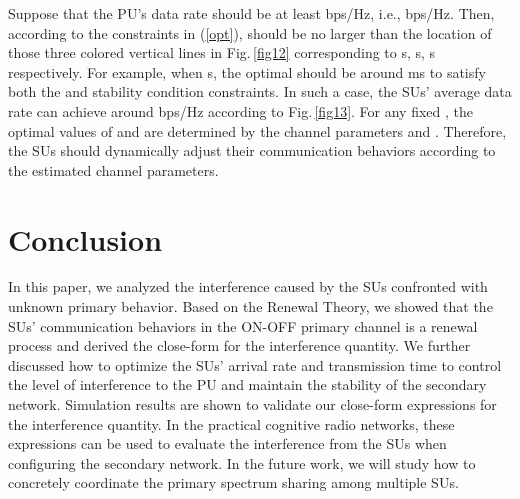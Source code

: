 \documentclass[11pt,draftcls]{IEEEtran}{\onecolumn}
\begin{document}
Suppose that the PU's data rate should be at least bps/Hz,
i.e., bps/Hz. Then, according to the
constraints in (\ref{opt}),  should be no larger than the
location of those three colored vertical lines in Fig.\,\ref{fig12}
corresponding to s, s, s respectively. For
example, when s, the optimal  should be
around ms to satisfy both the  and
stability condition constraints. In such a case, the SUs' average
data rate can achieve around bps/Hz according to
Fig.\,\ref{fig13}. For any fixed , the optimal
values of  and  are determined by the
channel parameters  and . Therefore, the SUs
should dynamically adjust their communication behaviors according to
the estimated channel parameters.















\section{Conclusion}\label{conclusion}
In this paper, we analyzed the interference caused by the SUs
confronted with unknown primary behavior. Based on the Renewal
Theory, we showed that the SUs' communication behaviors in the
ON-OFF primary channel is a renewal process and derived the
close-form for the interference quantity. We further discussed how
to optimize the SUs' arrival rate and transmission time to control
the level of interference to the PU and maintain the stability of
the secondary network. Simulation results are shown to validate our
close-form expressions for the interference quantity. In the
practical cognitive radio networks, these expressions can be used to
evaluate the interference from the SUs when configuring the
secondary network. In the future work, we will study how to
concretely coordinate the primary spectrum sharing among multiple
SUs.













\ifCLASSOPTIONcaptionsoff
  \newpage
\fi
\end{document}
